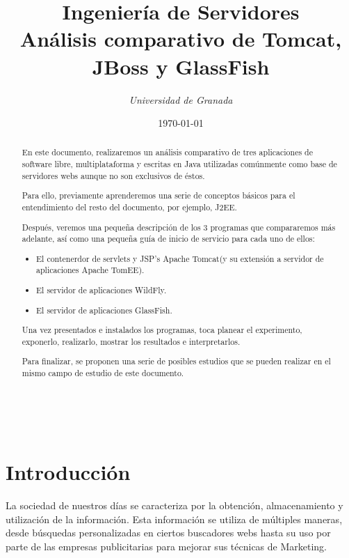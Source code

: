 \documentclass[a4paper, 10pt]{article}
\title{\textbf{Ingeniería de Servidores}\\ %
Análisis comparativo de Tomcat, JBoss y GlassFish} %
\author{ %
{\textit{Universidad de Granada}}} %
\date{\today} %
\makeatletter
\renewcommand{\maketitle}{
  \begin{flushright} %
  
  {\LARGE\@title} %
  
  \vspace{50pt} %
  
  {\large\@author} %
  \\\@date %
  \vspace{40pt} %
  \end{flushright}
}
\makeatother
\begin{document}
\maketitle %

\renewcommand{\abstractname}{Resumen} %
\begin{abstract}
	 En este documento, realizaremos un análisis comparativo de tres aplicaciones
	 de software libre, multiplataforma y escritas en Java utilizadas comúnmente
	 como base de servidores webs aunque no son exclusivos de éstos.
	 
	 Para ello, previamente aprenderemos una serie de conceptos básicos para el
	 entendimiento del resto del documento, por ejemplo, J2EE.
	 
	 Después, veremos una pequeña descripción de los 3 programas que compararemos
	 más adelante, así como una pequeña guía de inicio de servicio para cada uno
	 de ellos:
	 
	 \begin{itemize}
	 	\item El contenerdor de servlets y JSP's Apache Tomcat(y su extensión a 
	 	servidor de aplicaciones Apache TomEE).
	 	\item El servidor de aplicaciones WildFly.
	 	\item El servidor de aplicaciones GlassFish.
	 \end{itemize}
	 
	 Una vez presentados e instalados los programas, toca planear el experimento,
	 exponerlo, realizarlo, mostrar los resultados e interpretarlos.
	 
	 Para finalizar, se proponen una serie de posibles estudios que se pueden
	 realizar en el mismo campo de estudio de este documento.
\end{abstract}



\section{Introducción}
	La sociedad de nuestros días se caracteriza por la obtención, almacenamiento y
	utilización de la información. Esta información se utiliza de múltiples maneras,
	desde búsquedas personalizadas en ciertos buscadores webs hasta su uso por parte
	de las empresas publicitarias para mejorar sus técnicas de Marketing.
	
\end{document}
